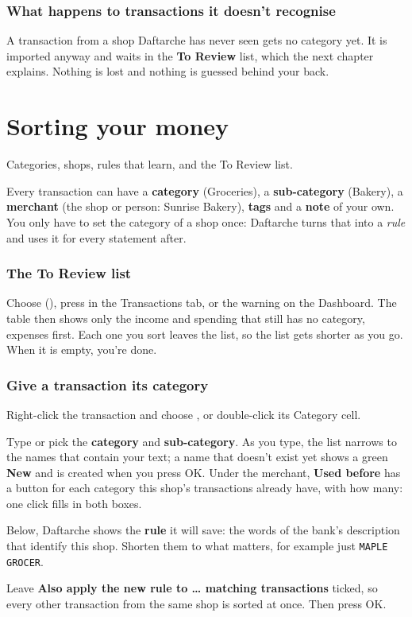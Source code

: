 \documentclass[11pt]{article}
\begin{document}
\subsection{What happens to transactions it doesn't recognise}
A transaction from a shop Daftarche has never seen gets no category yet. It is imported anyway
and waits in the \textbf{To Review} list, which the next chapter explains. Nothing is lost and
nothing is guessed behind your back.

\chapter{Sorting your money}{Categories, shops, rules that learn, and the To Review list.}\label{ch:4}

Every transaction can have a \textbf{category} (Groceries), a \textbf{sub-category} (Bakery), a
\textbf{merchant} (the shop or person: Sunrise Bakery), \textbf{tags} and a \textbf{note} of your own.
You only have to set the category of a shop once: Daftarche turns that into a \emph{rule} and uses it
for every statement after.

\subsection{The To Review list}
Choose  (), press  in the
Transactions tab, or the  warning on the Dashboard. The table then shows only the
income and spending that still has no category, expenses first. Each one you sort leaves the list,
so the list gets shorter as you go. When it is empty, you're done.

\subsection{Give a transaction its category}
\begin{steps}
  \item Right-click the transaction and choose , or double-click its
        Category cell.
  \item Type or pick the \textbf{category} and \textbf{sub-category}. As you type, the list narrows
        to the names that contain your text; a name that doesn't exist yet shows a green
        \textbf{\color{income}New} and is created when you press OK. Under the merchant,
        \textbf{Used before} has a button for each category this shop's transactions already have,
        with how many: one click fills in both boxes.
  \item Below, Daftarche shows the \textbf{rule} it will save: the words of the bank's description
        that identify this shop. Shorten them to what matters, for example just \texttt{MAPLE GROCER}.
  \item Leave \textbf{Also apply the new rule to … matching transactions} ticked, so every other
        transaction from the same shop is sorted at once. Then press OK.
\end{steps}
\end{document}

